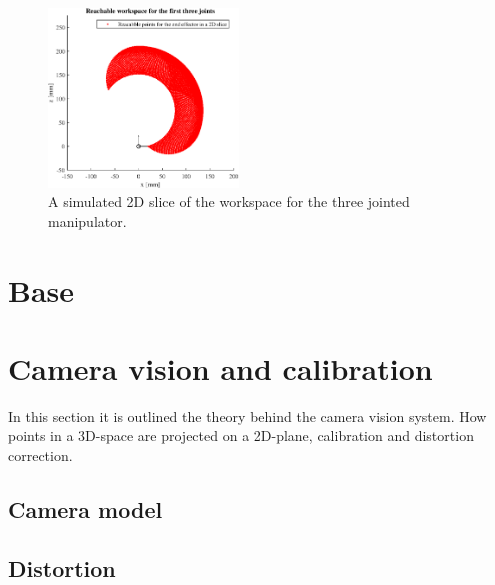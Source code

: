 \begin{figure}[H]
    \centering
    \includegraphics[width=0.45\textwidth]{chapters/img/workspace.eps}
    \caption{A simulated 2D slice of the workspace for the three jointed manipulator.}
    \label{fig:workspace_simulated}
\end{figure}

















\section*{Base}

\section*{Camera vision and calibration}
In this section it is outlined the theory behind the camera vision system. 
How points in a 3D-space are projected on a 2D-plane, calibration and distortion correction. 
\subsection*{Camera model}
\subsection*{Distortion}